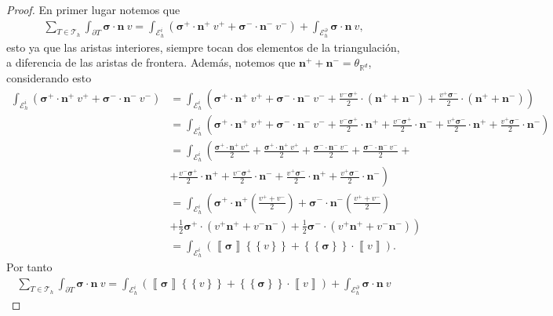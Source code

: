 \documentclass[10pt,a4paper]{report}
\newcommand{\bs}{\boldsymbol}
\providecommand{\salto}[1]{\left\llbracket#1\right\rrbracket}
\providecommand{\prom}[1]{\left \{\!\left \{#1\right \}\!\right \}}
\begin{document}
	\begin{proof}
		En primer lugar notemos que 
		\begin{align*}
			\sum_{T\in\mathscr{T}_{h}}\int_{\partial T}\bs{\sigma}\cdot \textbf{n}\ v = \int_{\mathscr{E}^{i}_{h}} \left( \bs{\sigma}^{+}\cdot \textbf{n}^{+}\ v^{+} + \bs{\sigma}^{-}\cdot \textbf{n}^{-}\ v^{-} \right) + \int_{\mathscr{E}^{\partial}_{h}}\bs{\sigma}\cdot \textbf{n}\ v,
		\end{align*} 
	    esto ya que las aristas interiores, siempre tocan dos elementos de la triangulación, a diferencia de las aristas de frontera. Además, notemos que $\textbf{n}^{+} + \textbf{n}^{-} = \theta_{\mathbb{R}^{d}}$, considerando esto
	    \begin{align*}
	    	\int_{\mathscr{E}^{i}_{h}} \left( \bs{\sigma}^{+}\cdot \textbf{n}^{+}\ v^{+} + \bs{\sigma}^{-}\cdot \textbf{n}^{-}\ v^{-} \right) &= \int_{\mathscr{E}^{i}_{h}} \left( \bs{\sigma}^{+}\cdot \textbf{n}^{+}\ v^{+} + \bs{\sigma}^{-}\cdot \textbf{n}^{-}\ v^{-} + \frac{v^{-}\bs{\sigma}^{+}}{2}\cdot\left(\textbf{n}^{+} + \textbf{n}^{-}\right) + \frac{v^{+}\bs{\sigma}^{-}}{2}\cdot\left(\textbf{n}^{+} + \textbf{n}^{-}\right) \right)\\
	    	&= \int_{\mathscr{E}^{i}_{h}} \left( \bs{\sigma}^{+}\cdot \textbf{n}^{+}\ v^{+} + \bs{\sigma}^{-}\cdot \textbf{n}^{-}\ v^{-} + \frac{v^{-}\bs{\sigma}^{+}}{2}\cdot\textbf{n}^{+} + \frac{v^{-}\bs{\sigma}^{+}}{2}\cdot\textbf{n}^{-} + \frac{v^{+}\bs{\sigma}^{-}}{2}\cdot\textbf{n}^{+} + \frac{v^{+}\bs{\sigma}^{-}}{2}\cdot\textbf{n}^{-} \right)\\
	    	&= \int_{\mathscr{E}^{i}_{h}} \left( \frac{\bs{\sigma}^{+}\cdot \textbf{n}^{+}\ v^{+}}{2} + \frac{\bs{\sigma}^{+}\cdot \textbf{n}^{+}\ v^{+}}{2} + \frac{\bs{\sigma}^{-}\cdot \textbf{n}^{-}\ v^{-}}{2} + \frac{\bs{\sigma}^{-}\cdot \textbf{n}^{-}\ v^{-}}{2} + \right.\\ &+\left.  \frac{v^{-}\bs{\sigma}^{+}}{2}\cdot\textbf{n}^{+} + \frac{v^{-}\bs{\sigma}^{+}}{2}\cdot\textbf{n}^{-} + \frac{v^{+}\bs{\sigma}^{-}}{2}\cdot\textbf{n}^{+} + \frac{v^{+}\bs{\sigma}^{-}}{2}\cdot\textbf{n}^{-} \right)\\
	    	&= \int_{\mathscr{E}^{i}_{h}} \left( \bs{\sigma}^{+}\cdot \textbf{n}^{+}\left(\frac{v^{+}+v^{-}}{2}\right) + \bs{\sigma}^{-}\cdot \textbf{n}^{-}\left(\frac{v^{+}+v^{-}}{2}\right)\right.\\ &+ \left. \frac{1}{2}\bs{\sigma}^{+}\cdot\left(v^{+}\textbf{n}^{+} + v^{-}\textbf{n}^{-}\right) +  \frac{1}{2}\bs{\sigma}^{-}\cdot\left(v^{+}\textbf{n}^{+} + v^{-}\textbf{n}^{-}\right)  \right)\\
	    	&= \int_{\mathscr{E}^{i}_{h}} \left(\salto{\bs{\sigma}}\prom{v}+\prom{\bs{\sigma}}\cdot \salto{v}\right).
	    \end{align*}
        Por tanto
        \begin{align*}
        	\sum_{T\in\mathscr{T}_{h}}\int_{\partial T}\bs{\sigma}\cdot \textbf{n}\ v = \int_{\mathscr{E}^{i}_{h}}\left(\salto{\bs{\sigma}}\prom{v}+\prom{\bs{\sigma}}\cdot \salto{v}\right) + \int_{\mathscr{E}^{\partial}_{h}}\bs{\sigma}\cdot \textbf{n}\ v
        \end{align*}
	\end{proof}
\end{document}
